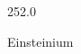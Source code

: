 \documentclass[12pt]{article}
\begin{document}
\hfill{}
\vfill
\begin{center}
  {\fontsize{50}{60}
  }

  \vspace{1em}

  252.0

Einsteinium
\end{center}
\vfill
\end{document}

